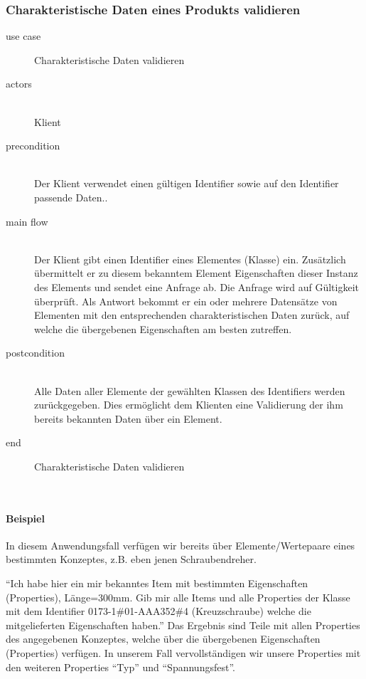 \subsubsection{Charakteristische Daten eines Produkts validieren}

{\small

\begin{description}
     \item[use case] Charakteristische Daten validieren
     \item[  actors]~\\
     Klient
     \item[  precondition]~\\
     Der Klient verwendet einen gültigen Identifier sowie auf den Identifier passende Daten..
     \item[  main flow]~\\
     Der Klient gibt einen Identifier eines Elementes (Klasse) ein. Zusätzlich übermittelt er zu diesem bekanntem Element Eigenschaften dieser Instanz des Elements und sendet eine Anfrage ab. Die Anfrage wird auf Gültigkeit überprüft. Als Antwort bekommt er ein oder mehrere Datensätze von Elementen mit den entsprechenden charakteristischen Daten zurück, auf welche die übergebenen Eigenschaften am besten zutreffen. 
     \item[  postcondition]~\\
     Alle Daten aller Elemente der gewählten Klassen des Identifiers werden zurückgegeben. Dies ermöglicht dem Klienten eine Validierung der ihm bereits bekannten Daten über ein Element. 
     \item[end] Charakteristische Daten validieren
\end{description}

~\\

} %

\paragraph{Beispiel}

In diesem Anwendungsfall verfügen wir bereits über Elemente/Wertepaare eines bestimmten Konzeptes, z.B. eben jenen Schraubendreher.

\enquote{Ich habe hier ein mir bekanntes Item mit bestimmten Eigenschaften (Properties), Länge=300mm. Gib mir alle Items und alle Properties der Klasse mit dem Identifier 0173-1\#01-AAA352\#4 (Kreuzschraube) welche die mitgelieferten Eigenschaften haben.}
Das Ergebnis sind Teile mit allen Properties des angegebenen Konzeptes, welche über die übergebenen Eigenschaften (Properties) verfügen. In unserem Fall vervollständigen wir unsere Properties mit den weiteren Properties \enquote{Typ} und \enquote{Spannungsfest}.

